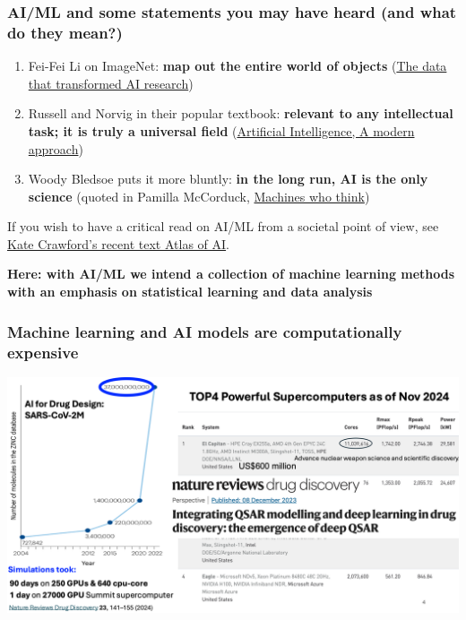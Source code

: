 \documentclass{beamer}
\begin{document}
\begin{frame}
\frametitle{AI/ML and some statements you may have heard (and what do they mean?)}



\begin{enumerate}
\item Fei-Fei Li on ImageNet: \textbf{map out the entire world of objects} (\href{{https://cacm.acm.org/news/219702-the-data-that-transformed-ai-research-and-possibly-the-world/fulltext}}{The data that transformed AI research})

\item Russell and Norvig in their popular textbook: \textbf{relevant to any intellectual task; it is truly a universal field} (\href{{http://aima.cs.berkeley.edu/}}{Artificial Intelligence, A modern approach})

\item Woody Bledsoe puts it more bluntly: \textbf{in the long run, AI is the only science} (quoted in Pamilla McCorduck, \href{{https://www.pamelamccorduck.com/machines-who-think}}{Machines who think})
\end{enumerate}

\noindent
If you wish to have a critical read on AI/ML from a societal point of view, see \href{{https://www.katecrawford.net/}}{Kate Crawford's recent text Atlas of AI}.

\textbf{Here: with AI/ML we intend a collection of machine learning methods with an emphasis on statistical learning and data analysis}
\end{frame}






\begin{frame}
\frametitle{Machine learning and AI models are computationally expensive}


\centerline{\includegraphics[width=1.0\linewidth]{figures/aitalk2.png}}

\end{frame}
\end{document}
